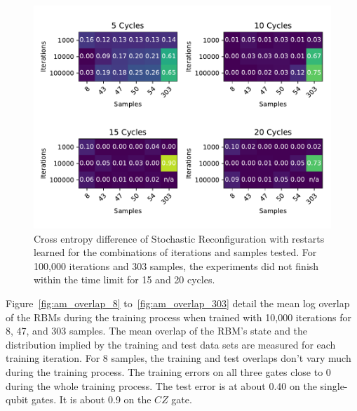 \begin{figure}[H]
  \centering
  \includegraphics[width=\textwidth]{figures/results/AM-restarts-learned/fxeb_heatmap.pdf}
  \caption[Cross entropy difference of AdaMax with restarts learned]{Cross entropy difference of Stochastic 
  Reconfiguration with restarts learned for the combinations of iterations and samples tested.
  For 100,000 iterations and 303 samples, the experiments did not finish within the time limit for 15 and 20 cycles.}
  \label{fig:am_fxeb}
\end{figure}

Figure~\ref{fig:am_overlap_8} to~\ref{fig:am_overlap_303} detail the mean log overlap of the RBMs during the 
training process when trained with 10,000 iterations for 8, 47, and 303 samples. The 
mean overlap of the RBM's state and the distribution implied by the training and test data sets are measured 
for each training iteration.
For 8 samples, the training and test overlaps don't vary much during the training process. The training errors on all three gates
close to 0 during the whole training process. The test error is at about 0.40 on the single-qubit gates. It is about 
0.9 on the $CZ$ gate.

